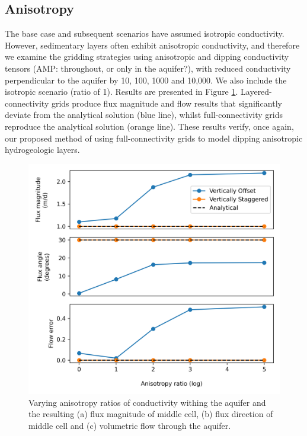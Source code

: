 \documentclass{article}
\begin{document}
\subsection{Anisotropy}

The base case and subsequent scenarios have assumed isotropic conductivity. However, sedimentary layers often exhibit anisotropic conductivity, and therefore we examine the gridding strategies using anisotropic and dipping conductivity tensors {\color{red} (AMP: throughout, or only in the aquifer?)}, with reduced conductivity perpendicular to the aquifer by 10, 100, 1000 and 10,000. We also include the isotropic scenario (ratio of 1). Results are presented in Figure \ref{fig:fig5}. 
Layered-connectivity grids produce flux magnitude and flow results that significantly deviate from the analytical solution (blue line), whilst full-connectivity grids reproduce the analytical solution (orange line). These results verify, once again, our proposed method of using full-connectivity grids to model dipping anisotropic hydrogeologic layers.


\begin{figure}
	\begin{center}
	\includegraphics[scale=0.9]{../figures/fig5paper.png}
	\caption{Varying anisotropy ratios of conductivity withing the aquifer and the resulting (a) flux magnitude of middle cell, (b) flux direction of middle cell and (c) volumetric flow through the aquifer. }
	\label{fig:fig5}
	\end{center}
\end{figure}
\end{document}
